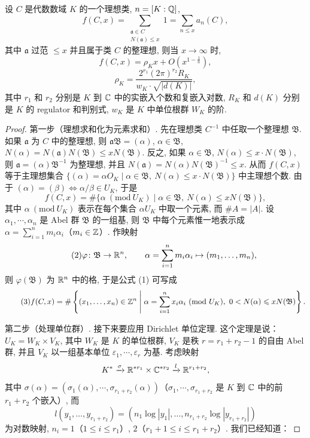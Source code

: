 \begin{theorem}\label{thm:4.13}
设 $C$ 是代数数域 $K$ 的一个理想类, $n=[K:\mathbb{Q}]$, 
\[
  f(C,x)=\sum_{\substack{\mathfrak{a}\in C\\ N(\mathfrak{a})\leqslant x}}1=\sum_{n\leqslant x}a_n(C),
\]
其中 $\mathfrak{a}$ 过范 $\leqslant x$ 并且属于类 $C$ 的整理想, 则当 $x\to\infty$ 时, 
\[
  f(C,x)=\rho_Kx+O\left(x^{1-\frac{1}{n}}\right),
\]
\[
  \rho_K=\frac{2^{r_1}(2\pi)^{r_2}R_K}{w_K\cdot\sqrt{|d(K)|}},
\]
其中 $r_1$ 和 $r_2$ 分别是 $K$ 到 $\mathbb{C}$ 中的实嵌入个数和复嵌入对数, $R_K$ 和 $d(K)$ 分别是 $K$ 的 regulator 和判别式, $w_K$ 是 $K$ 中单位根群 $W_K$ 的阶. 
\end{theorem}

\begin{proof}
第一步（理想求和化为元素求和）. 先在理想类 $C^{-1}$ 中任取一个整理想 $\mathfrak{B}$. 如果 $\mathfrak{a}$ 为 $C$ 中的整理想, 则 $\mathfrak{a}\mathfrak{B}=(\alpha)$, $\alpha\in\mathfrak{B}$, $N(\alpha)=N(\mathfrak{a})N(\mathfrak{B})\leqslant xN(\mathfrak{B})$. 反之, 如果 $\alpha\in\mathfrak{B}$, $N(\alpha)\leqslant x\cdot N(\mathfrak{B})$, 则 $\mathfrak{a}=(\alpha)\mathfrak{B}^{-1}$ 为整理想, 并且 $N(\mathfrak{a})=N(\alpha)N(\mathfrak{B})^{-1}\leqslant x$. 从而 $f(C,x)$ 等于主理想集合 $\{(\alpha)=\alpha O_K\mid\alpha\in\mathfrak{B},\ N(\alpha)\leqslant x\cdot N(\mathfrak{B})\}$ 中主理想个数. 由于 $(\alpha)=(\beta)\Leftrightarrow\alpha/\beta\in U_K$, 于是
\begin{equation}\tag{1}
  f(C,x)=\#\{\alpha\ (\mathrm{mod}\ U_K)\mid\alpha\in\mathfrak{B},\ N(\alpha)\leqslant xN(\mathfrak{B})\},
\end{equation}
其中 $\alpha\ (\mathrm{mod}\ U_K)$ 表示在每个集合 $\alpha U_K$ 中取一个元素, 而 $\#A=|A|$. 设 $\alpha_1,\cdots,\alpha_n$ 是 Abel 群 $\mathfrak{B}$ 的一组基, 则 $\mathfrak{B}$ 中每个元素惟一地表示成 $\alpha=\sum_{i=1}^{n}m_i\alpha_i$（$m_i\in\mathbb{Z}$）. 作映射
\begin{equation}\tag{2}
  \varphi\colon\mathfrak{B}\to\mathbb{R}^n,\qquad \alpha=\sum_{i=1}^{n}m_i\alpha_i\mapsto(m_1,\dots,m_n),
\end{equation}
则 $\varphi(\mathfrak{B})$ 为 $\mathbb{R}^n$ 中的格, 于是公式 (1) 可写成
\begin{equation}\tag{3}
  f(C,x)=\#\left\{(x_1,\dots,x_n)\in\Z^n\;\middle|\;\alpha=\sum_{i=1}^{n}x_i\alpha_i\ (\mathrm{mod}\ U_K),\ 0<N(\alpha)\leqslant xN(\mathfrak{B})\right\}.
\end{equation}

第二步（处理单位群）. 接下来要应用 Dirichlet 单位定理. 这个定理是说：$U_K=W_K\times V_K$, 其中 $W_K$ 是 $K$ 的单位根群, $V_K$ 是秩 $r=r_1+r_2-1$ 的自由 Abel 群, 并且 $V_K$ 以一组基本单位 $\varepsilon_1,\cdots,\varepsilon_r$ 为基. 考虑映射
\[
  K^*\xrightarrow{\sigma}\mathbb{R}^{*r_1}\times\mathbb{C}^{*r_2}\xrightarrow{l}\mathbb{R}^{r_1+r_2},
\]
其中 $\sigma(\alpha)=(\sigma_1(\alpha),\cdots,\sigma_{r_1+r_2}(\alpha))$（$\sigma_1,\cdots,\sigma_{r_1+r_2}$ 是 $K$ 到 $\mathbb{C}$ 中的前 $r_1+r_2$ 个嵌入）, 而
\[
  l(y_1,\dots,y_{r_1+r_2})=(n_1\log|y_1|,\dots,n_{r_1+r_2}\log|y_{r_1+r_2}|)
\]
为对数映射, $n_i=1$（$1\leqslant i\leqslant r_1$）, $2$（$r_1+1\leqslant i\leqslant r_1+r_2$）. 我们已经知道：


\end{proof}
